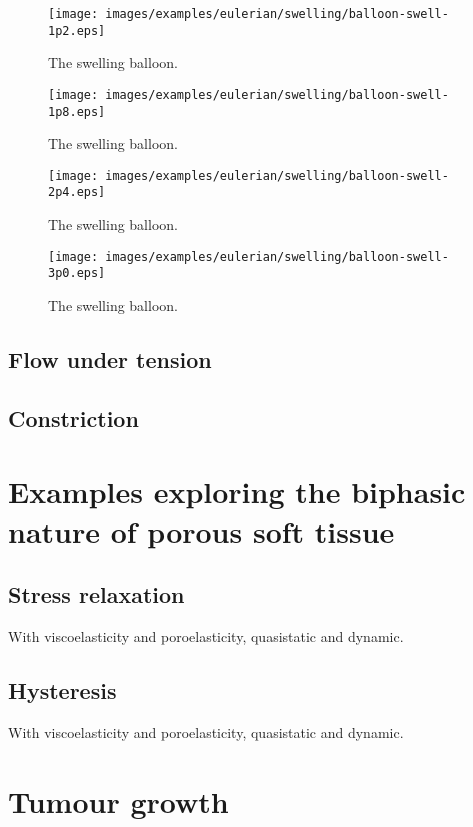 \begin{figure}
\centering
{\texttt{[image: images/examples/eulerian/swelling/balloon-swell-1p2.eps]}}
\caption{The swelling balloon.} 
\label{swelling-balloon-image-2}
\end{figure}

\begin{figure}
\centering
{\texttt{[image: images/examples/eulerian/swelling/balloon-swell-1p8.eps]}}
\caption{The swelling balloon.} 
\label{swelling-balloon-image-3}
\end{figure}

\begin{figure}
\centering
{\texttt{[image: images/examples/eulerian/swelling/balloon-swell-2p4.eps]}}
\caption{The swelling balloon.} 
\label{swelling-balloon-image-4}
\end{figure}

\begin{figure}
\centering
{\texttt{[image: images/examples/eulerian/swelling/balloon-swell-3p0.eps]}}
\caption{The swelling balloon.} 
\label{swelling-balloon-image-5}
\end{figure}

\subsection{Flow under tension}
\label{tenson-flow}

\subsection{Constriction}
\label{constriction-2}

\section{Examples exploring the biphasic nature of porous soft tissue}
\label{biphasic-examples-2}

\subsection{Stress relaxation}
\label{stress-relaxation}
With viscoelasticity and poroelasticity, quasistatic and dynamic.

\subsection{Hysteresis}
\label{hysteresis}
With viscoelasticity and poroelasticity, quasistatic and dynamic.

\section{Tumour growth}
\label{tumor-growth}

%

